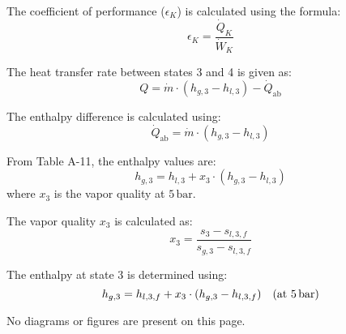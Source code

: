 The coefficient of performance (\( \epsilon_K \)) is calculated using the formula:  
\[
\epsilon_K = \frac{\dot{Q}_K}{\dot{W}_K}
\]  

The heat transfer rate between states 3 and 4 is given as:  
\[
Q = \dot{m} \cdot (h_{g,3} - h_{l,3}) - \dot{Q}_{\text{ab}}
\]  

The enthalpy difference is calculated using:  
\[
\dot{Q}_{\text{ab}} = \dot{m} \cdot (h_{g,3} - h_{l,3})
\]  

From Table A-11, the enthalpy values are:  
\[
h_{g,3} = h_{l,3} + x_3 \cdot (h_{g,3} - h_{l,3})
\]  
where \( x_3 \) is the vapor quality at \( 5 \, \text{bar} \).  

The vapor quality \( x_3 \) is calculated as:  
\[
x_3 = \frac{s_3 - s_{l,3,f}}{s_{g,3} - s_{l,3,f}}
\]  

The enthalpy at state 3 is determined using:  
\[
h_{g,3} = h_{l,3,f} + x_3 \cdot (h_{g,3} - h_{l,3,f}) \quad \text{(at \( 5 \, \text{bar} \))}
\]  

No diagrams or figures are present on this page.